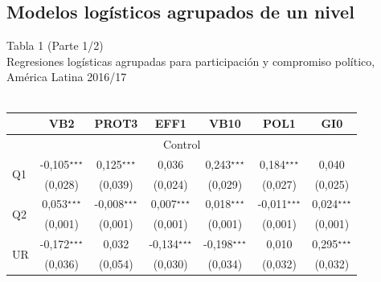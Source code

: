 \documentclass[a4paper]{tufte-handout}
\begin{document}
\subsection[Modelos logísticos agrupados de un nivel] {Modelos logísticos agrupados de un nivel}


\begin{table}[h]
  \centering
  \selectfont
   \smallskip\noindent\small Tabla 1 (Parte 1/2) \\ Regresiones logísticas agrupadas para participación y compromiso político, América Latina 2016/17  \\~\\
  \begin{tabular}{l c c c c c c}
    \toprule
     & VB2 & PROT3 & EFF1 & VB10 & POL1 & GI0 \\ \midrule
    \multicolumn{7}{c}{Control} \\ \midrule
    \multirow{2}{*}{Q1} & -0,105$^\star$$^\star$$^\star$ & 0,125$^\star$$^\star$$^\star$ & 0,036 & 0,243$^\star$$^\star$$^\star$ & 0,184$^\star$$^\star$$^\star$ & 0,040 \\
    & {\scriptsize (0,028)} & {\scriptsize (0,039)} & {\scriptsize (0,024)} & {\scriptsize (0,029)} & {\scriptsize (0,027)} & {\scriptsize (0,025)} \\ 
    \multirow{2}{*}{Q2} & 0,053$^\star$$^\star$$^\star$ & -0,008$^\star$$^\star$$^\star$ & 0,007$^\star$$^\star$$^\star$ & 0,018$^\star$$^\star$$^\star$ & -0,011$^\star$$^\star$$^\star$ & 0,024$^\star$$^\star$$^\star$ \\
    & {\scriptsize (0,001)} & {\scriptsize (0,001)} & {\scriptsize (0,001)} & {\scriptsize (0,001)} & {\scriptsize (0,001)} & {\scriptsize (0,001)} \\
    \multirow{2}{*}{UR} & -0,172$^\star$$^\star$$^\star$ & 0,032 & -0,134$^\star$$^\star$$^\star$ & -0,198$^\star$$^\star$$^\star$ & 0,010 & 0,295$^\star$$^\star$$^\star$ \\
    & {\scriptsize (0,036)} & {\scriptsize (0,054)} & {\scriptsize (0,030)} & {\scriptsize (0,034)} & {\scriptsize (0,032)} & {\scriptsize (0,032)} \\ \midrule

\end{tabular}
\end{table}
\end{document}
